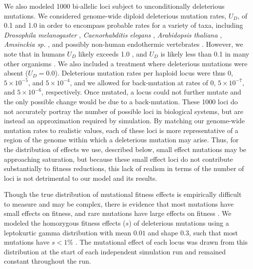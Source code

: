 We also modeled 1000 bi-allelic loci subject to unconditionally deleterious mutations. We considered genome-wide diploid deleterious mutation rates, $U_D$, of 0.1 and 1.0 in order to encompass probable rates for a variety of taxa, including \emph{Drosophila melanogaster} \citep{Haag:2007}, \emph{Caenorhabditis elegans} \citep{Denver:2004}, \emph{Arabidopsis thaliana} \citep{Shaw:2000}, \emph{Amsinckia sp.} \citep{Schoen:2005}, and possibly non-human endothermic vertebrates \citep{Baer:2007}. However, we note that in humans $U_D$ likely exceeds 1.0 \citep{Keightley:2012}, and $U_D$ is likely less than 0.1 in many other organisms \citep{Baer:2007, Halligan:2009}. We also included a treatment where deleterious mutations were absent ($U_D = 0.0$). Deleterious mutation rates per haploid locus were thus $0$, $5\times10^{-5}$, and $5\times10^{-4}$, and we allowed for back-mutation at rates of $0$, $5\times10^{-7}$, and $5\times10^{-6}$, respectively. Once mutated, a locus could not further mutate and the only possible change would be due to a back-mutation. These 1000 loci do not accurately portray the number of possible loci in biological systems, but are instead an approximation required by simulation. By matching our genome-wide mutation rates to realistic values, each of these loci is more representative of a region of the genome within which a deleterious mutation may arise. Thus, for the distribution of effects we use, described below, small effect mutations may be approaching saturation, but because these small effect loci do not contribute substantially to fitness reductions, this lack of realism in terms of the number of loci is not detrimental to our model and its results. 

Though the true distribution of mutational fitness effects is empirically difficult to measure and may be complex, there is evidence that most mutations have small effects on fitness, and rare mutations have large effects on fitness \citep{Eyre:2007}. We modeled the homozygous fitness effects ($s$) of deleterious mutations using a leptokurtic gamma distribution with mean $0.01$ and shape $0.3$, such that most mutations have $s < 1\%$ \citep{Keightley:1994}. The mutational effect of each locus was drawn from this distribution at the start of each independent simulation run and remained constant throughout the run.

